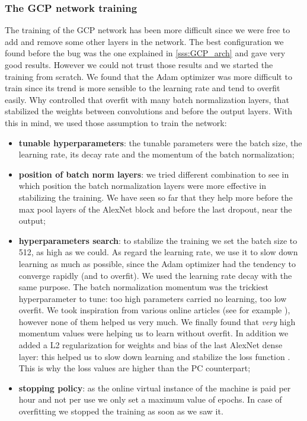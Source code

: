 \subsubsection{The GCP network training}\label{sss:GCP_training}
The training of the GCP network has been more difficult since we were free to add and remove some other layers in the network. The best configuration we found before the bug was the one explained in \ref{sss:GCP_arch} and gave very good results. However we could not trust those results and we started the training from scratch. We found that the Adam optimizer was more difficult to train since its trend is more sensible to the learning rate and tend to overfit easily. Why controlled that overfit with many batch normalization layers, that stabilized the weights between convolutions and before the output layers. With this in mind, we used those assumption to train the network:
\begin{itemize}
    \item \textbf{tunable hyperparameters}: the tunable parameters were the batch size, the learning rate, its decay rate and the momentum of the batch normalization;
    \item \textbf{position of batch norm layers}: we tried different combination to see in which position the batch normalization layers were more effective in stabilizing the training. We have seen so far that they help more before the max pool layers of the AlexNet block and before the last dropout, near the output;
    \item \textbf{hyperparameters search}: to stabilize the training we set the batch size to 512, as high as we could. As regard the learning rate, we use it to slow down learning as much as possible, since the Adam optimizer had the tendency to converge rapidly (and to overfit). We used the learning rate decay with the same purpose. The batch normalization momentum was the trickiest hyperparameter to tune: too high parameters carried no learning, too low overfit. We took inspiration from various online articles (see for example \cite{batch_norm_online}), however none of them helped us very much. We finally found that \emph{very} high momentum values were helping us to learn without overfit. In addition we added a L2 regularization for weights and bias of the last AlexNet dense layer: this helped us to slow down learning and stabilize the loss function \cite{l2_neural_networks}. This is why the loss values are higher than the PC counterpart;
    \item \textbf{stopping policy}: as the online virtual instance of the machine is paid per hour and not per use we only set a maximum value of epochs. In case of overfitting we stopped the training as soon as we saw it.
\end{itemize}
